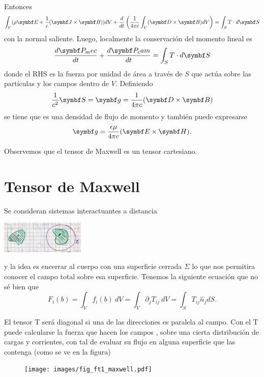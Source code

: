 \documentclass[10pt,oneside]{CBFT_book}
\begin{document}
Entonces
\[
	\int_V (\rho\vb{E} + \frac{1}{c}(\pv{J}{B}) ) dV + 
	\dtot{}{t}\left( \frac{1}{4\pi c}\int_V (\pv{D}{B})dV\right) = \int_S T \cdot d\vb{S}
\]
con la normal saliente. Luego, localmente la conservación del momento lineal es
\[
	\dtot{\vb{P}_mec}{t} + \dtot{\vb{P}_cam}{t}  = \int_S T \cdot d\vb{S}
\]
donde el RHS es la fuerza por unidad de área a través de $S$ que actúa sobre las partículas y
los campos dentro de $V$.
Definiendo
\[
	\frac{1}{c^2} \vb{S}=  \vb{g} = \frac{1}{4\pi c}(\pv{D}{B})
\]
se tiene que  es una densidad de flujo de momento y también puede expresarse
\[
	\vb{g} = \frac{\epsilon\mu}{4\pi c}(\pv{E}{H}).
\]

Observemos que el tensor de Maxwell es un tensor cartesiano.



\section{Tensor de Maxwell}

Se consideran sistemas interactuantes a distancia

\includegraphics[width=0.3\textwidth]{images/fig_ft1_PicsMaxwellA.jpg}

y la idea es encerrar al cuerpo con una superficie cerrada $\Sigma$ lo que nos permitira conocer
el campo total sobre esa superficie.
Tenemos la siguiente ecuación que no sé bien que
\[
	F_i(b) = \int_V f_i(b) \: dV = \int_V \partial_j T_{ij} \: dV = \int_S T_{ij} \hat{n}_j dS.
\]

El tensor T será diagonal si una de las direcciones es paralela al campo. Con el T puede calcularse
la fuerza que hacen los campos ,  sobre una cierta distribución de cargas y corrientes,
con tal de evaluar su flujo en alguna superficie que las contenga (como se ve en la figura)

\begin{figure}[htb]
	\begin{center}
	\texttt{[image: images/fig\_ft1\_maxwell.pdf]}	 
	\end{center}
	\caption{}
\end{figure} 
\end{document}
